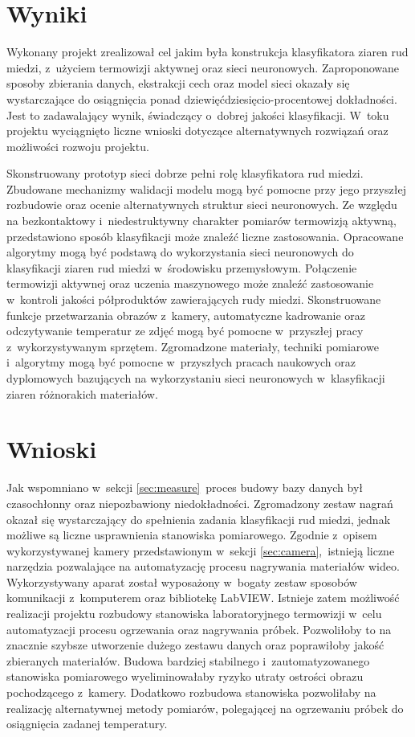 \section{Wyniki}
Wykonany projekt zrealizował cel jakim była konstrukcja klasyfikatora ziaren rud
miedzi, z~użyciem termowizji aktywnej oraz sieci neuronowych.
Zaproponowane sposoby zbierania danych, ekstrakcji cech oraz model sieci okazały
się wystarczające do osiągnięcia ponad dziewięćdziesięcio-procentowej
dokładności.
Jest to zadawalający wynik, świadczący o~dobrej jakości klasyfikacji.
W~toku projektu wyciągnięto liczne wnioski dotyczące alternatywnych rozwiązań
oraz możliwości rozwoju projektu.

Skonstruowany prototyp sieci dobrze pełni rolę klasyfikatora rud miedzi.
Zbudowane mechanizmy walidacji modelu mogą być pomocne przy jego przyszłej
rozbudowie oraz ocenie alternatywnych struktur sieci neuronowych.
Ze względu na bezkontaktowy i~niedestruktywny charakter pomiarów termowizją
aktywną, przedstawiono sposób klasyfikacji może znaleźć liczne zastosowania.
Opracowane algorytmy mogą być podstawą do wykorzystania sieci neuronowych do
klasyfikacji ziaren rud miedzi w~środowisku przemysłowym.
Połączenie termowizji aktywnej oraz uczenia maszynowego może znaleźć
zastosowanie w~kontroli jakości półproduktów zawierających rudy miedzi.
Skonstruowane funkcje przetwarzania obrazów z~kamery, automatyczne kadrowanie
oraz odczytywanie temperatur ze zdjęć mogą być pomocne w~przyszłej pracy
z~wykorzystywanym sprzętem.
Zgromadzone materiały, techniki pomiarowe i~algorytmy mogą być pomocne
w~przyszłych pracach naukowych oraz dyplomowych bazujących na wykorzystaniu
sieci neuronowych w~klasyfikacji ziaren różnorakich materiałów.

\section{Wnioski}
Jak wspomniano w~sekcji \ref{sec:measure}~proces budowy bazy danych był
czasochłonny oraz niepozbawiony niedokładności.
Zgromadzony zestaw nagrań okazał się wystarczający do spełnienia zadania
klasyfikacji rud miedzi, jednak możliwe są liczne usprawnienia stanowiska
pomiarowego.
Zgodnie z~opisem wykorzystywanej kamery przedstawionym w~sekcji
\ref{sec:camera},~istnieją liczne narzędzia pozwalające na automatyzację
procesu nagrywania materiałów wideo.
Wykorzystywany aparat został wyposażony w~bogaty zestaw sposobów komunikacji
z~komputerem oraz bibliotekę LabVIEW.
Istnieje zatem możliwość realizacji projektu rozbudowy stanowiska
laboratoryjnego termowizji w~celu automatyzacji procesu ogrzewania oraz
nagrywania próbek.
Pozwoliłoby to na znacznie szybsze utworzenie dużego zestawu danych oraz
poprawiłoby jakość zbieranych materiałów.
Budowa bardziej stabilnego i~zautomatyzowanego stanowiska pomiarowego
wyeliminowałaby ryzyko utraty ostrości obrazu pochodzącego z~kamery.
Dodatkowo rozbudowa stanowiska pozwoliłaby na realizację alternatywnej
metody pomiarów, polegającej na ogrzewaniu próbek do osiągnięcia zadanej
temperatury.

